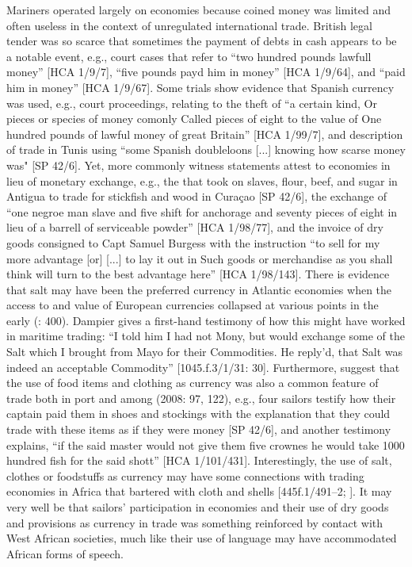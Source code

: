 Mariners operated largely on  economies because coined money was limited and often useless in the context of unregulated international trade. British legal tender was so scarce that sometimes the payment of debts in cash appears to be a notable event, e.g., court cases that refer to “two hundred pounds lawfull money” [HCA 1/9/7], “five pounds payd him in money” [HCA 1/9/64], and “paid him in money” [HCA 1/9/67]. Some trials show evidence that Spanish currency was used, e.g., court proceedings, relating to the theft of “a certain kind, Or pieces or species of money comonly Called pieces of eight to the value of One hundred pounds of lawful money of great Britain” [HCA 1/99/7], and description of trade in Tunis using “some Spanish doubleloons [...] knowing how scarse money was" [SP 42/6]. Yet, more commonly witness statements attest to  economies in lieu of monetary exchange, e.g., the  that took on slaves, flour, beef, and sugar in Antigua to trade for stickfish and wood in Curaçao [SP 42/6], the exchange of “one negroe man slave and five shift for anchorage and seventy pieces of eight in lieu of a barrell of serviceable powder” [HCA 1/98/77], and the invoice of dry goods consigned to Capt Samuel Burgess with the instruction “to sell for my more advantage [or] [...] to lay it out in Such goods or merchandise as you shall think will turn to the best advantage here” [HCA 1/98/143]. There is evidence that salt may have been the preferred currency in Atlantic  economies when the access to and value of European currencies collapsed at various points in the early  (\citealt{Jarvis2010}: 400). Dampier gives a first-hand testimony of how this might have worked in maritime trading: “I told him I had not Mony, but would exchange some of the Salt which I brought from Mayo for their Commodities. He reply’d, that Salt was indeed an acceptable Commodity” [1045.f.3/1/31: 30]. Furthermore, \citeauthor{AdkinsAdkins2008} suggest that the use of food items and clothing as currency was also a common feature of trade both in port and among  (2008: 97, 122), e.g., four sailors testify how their captain paid them in shoes and stockings with the explanation that they could trade with these items as if they were money [SP 42/6], and another testimony explains, “if the said master would not give them five crownes he would take 1000 hundred fish for the said shott” [HCA 1/101/431]. Interestingly, the use of salt, clothes or foodstuffs as currency may have some connections with trading economies in Africa that bartered with cloth and shells [445f.1/491–2; \citealt{HogendornJohnson2003}]. It may very well be that sailors’ participation in  economies and their use of dry goods and provisions as currency in trade was something reinforced by contact with West African societies, much like their use of language may have accommodated African forms of speech. 

